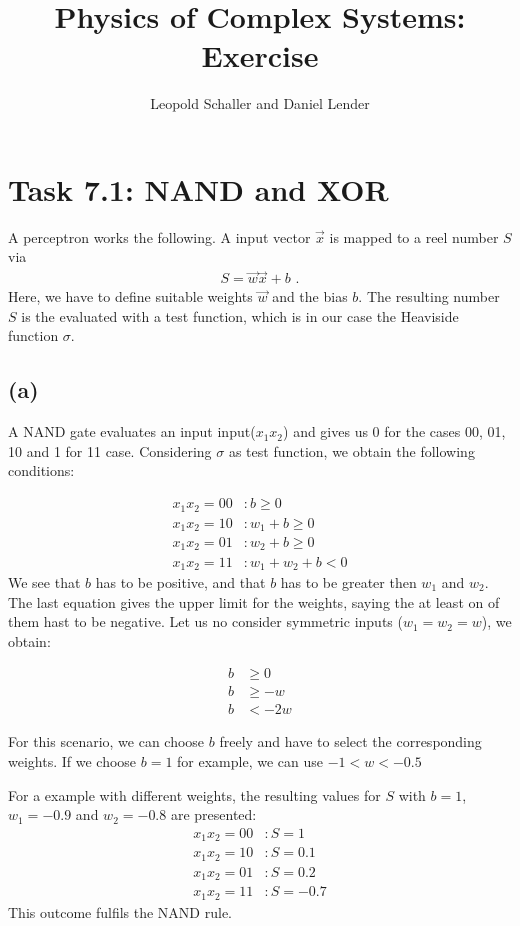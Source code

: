 \documentclass{article}
\title{Physics of Complex Systems: Exercise }
\author{Leopold Schaller and Daniel Lender}
\begin{document}
\maketitle

\section*{Task 7.1: NAND and XOR}
A perceptron works the following. A input vector $\vec{x}$ is mapped to a reel number $S$ via
\begin{align}
    S = \vec{w} \vec{x} + b \text{ .}
\end{align}
Here, we have to define suitable weights $\vec{w}$ and the bias $b$. The resulting number $S$ is the evaluated with a test function, which is in our case the Heaviside  function $\sigma$.
\subsection*{(a)}
A NAND gate evaluates an input input($x_1x_2$) and gives us 0 for the cases 00, 01, 10 and 1 for 11 case. Considering $\sigma$ as test function, we obtain the following conditions:

\begin{align}
x_1x_2 = 00 &: b \ge 0 \\
x_1x_2 = 10 &: w_1 + b \ge 0 \\
x_1x_2 = 01 &: w_2 + b \ge 0 \\
x_1x_2 = 11 &: w_1 + w_2 + b < 0
\end{align}
We see that $b$ has to be positive, and that $b$ has to be greater then $w_1$ and $w_2$. The last equation gives the upper limit for the weights, saying the at least on of them hast to be negative. Let us no consider symmetric inputs ($w_1 = w_2 = w$), we obtain:

\begin{align}
    b &\ge 0 \\
    b &\ge -w \\
    b &< -2w
\end{align}

For this scenario, we can choose $b$ freely and have to select the corresponding weights. If we choose $b=1$ for example, we can use $-1<w<-0.5$

For a example with different weights, the resulting values for $S$ with $b=1$,$w_1=-0.9$ and $w_2 = -0.8$ are presented:
\begin{align}
x_1x_2 = 00 &: S=1 \\
x_1x_2 = 10 &: S=0.1 \\
x_1x_2 = 01 &: S=0.2 \\
x_1x_2 = 11 &: S=-0.7
\end{align}
This outcome fulfils the NAND rule.
\end{document}
